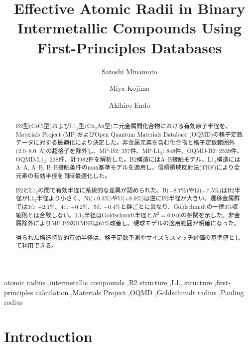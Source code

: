 \documentclass[a4paper,10pt,5p]{elsarticle}
\begin{document}
\begin{frontmatter}

\title{Effective Atomic Radii in Binary Intermetallic Compounds Using First-Principles Databases}

\author[nims]{Satoshi Minamoto}
\author[nims]{Miya Kojima}  
\author[nims]{Akihiro Endo}




\begin{abstract}

B2型(CsCl型)およびL1$_2$型(Cu$_3$Au型)二元金属間化合物における有効原子半径を、Materials Project (MP)およびOpen Quantum Materials Database (OQMD)の格子定数データに対する最適化により決定した。非金属元素を含む化合物と格子定数範囲外(2.0--8.0~\AA)の超格子を除外し、MP-B2: 357件、MP-L1$_2$: 848件、OQMD-B2: 2539件、OQMD-L1$_2$: 238件、計3982件を解析した。B2構造にはA--B接触モデル、L1$_2$構造にはA--A, A--B, B--B接触条件のmax基準モデルを適用し、信頼領域反射法(TRF)により全元素の有効半径を同時最適化した。

B2とL1$_2$の間で有効半径に系統的な差異が認められた。B($-8.7$\%)やLi($-7.5$\%)はB2半径がL1$_2$半径より小さく、Ni($+9.3$\%)やU($+8.9$\%)は逆にB2半径が大きい。遷移金属群では3d: $+2.1$\%、4d: $+0.2$\%、5d: $-0.4$\%と群ごとに異なり、Goldschmidtの一律3\%収縮則とは合致しない。L1$_2$半径はGoldschmidt半径と$R^2=0.946$の相関を示した。非金属除外によりMP-B2のRMSEは67\%改善し、硬球モデルの適用範囲が明確になった。

得られた構造特異的有効半径は、格子定数予測やサイズミスマッチ評価の基準値として利用できる。
\end{abstract}

\begin{keyword}
atomic radius \sep intermetallic compounds \sep B2 structure \sep L1$_2$ structure \sep first-principles calculation \sep Materials Project \sep OQMD \sep Goldschmidt radius \sep Pauling radius
\end{keyword}

\end{frontmatter}




\section{Introduction}
\end{document}
